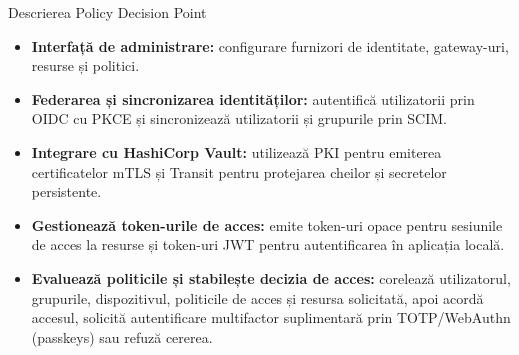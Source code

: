 \documentclass[aspectratio=169,12pt]{beamer}
\begin{document}
\begin{frame}{Descrierea Policy Decision Point}
\vfill
{%
\small
\begin{itemize}
  \setlength{\itemsep}{0.23cm}
  \item \textbf{Interfață de administrare:} configurare furnizori de identitate, gateway-uri, resurse și politici.
  \item \textbf{Federarea și sincronizarea identităților:} autentifică utilizatorii prin OIDC cu PKCE și sincronizează utilizatorii și grupurile prin SCIM.
  \item \textbf{Integrare cu HashiCorp Vault:} utilizează PKI pentru emiterea certificatelor mTLS și Transit pentru protejarea cheilor și secretelor persistente.
  \item \textbf{Gestionează token-urile de acces:} emite token-uri opace pentru sesiunile de acces la resurse și token-uri JWT pentru autentificarea în aplicația locală.
  \item \textbf{Evaluează politicile și stabilește decizia de acces:} corelează utilizatorul, grupurile, dispozitivul, politicile de acces și resursa solicitată, apoi acordă accesul, solicită autentificare multifactor suplimentară prin TOTP/WebAuthn (passkeys) sau refuză cererea.
\end{itemize}
}
\vfill
\end{frame}
\end{document}
